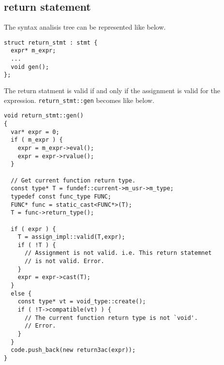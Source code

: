 \subsection{return statement}

The syntax analisis tree can be represented like below.
\begin{verbatim}
struct return_stmt : stmt {
  expr* m_expr;
  ...
  void gen();
};
\end{verbatim}
The return statment is valid if and only if the assignment is valid for the
expression.
{\tt{return\_stmt::gen}} becomes like below.
\begin{verbatim}
void return_stmt::gen()
{
  var* expr = 0;
  if ( m_expr ) {
    expr = m_expr->eval();
    expr = expr->rvalue();
  }

  // Get current function return type.
  const type* T = fundef::current->m_usr->m_type;
  typedef const func_type FUNC;
  FUNC* func = static_cast<FUNC*>(T);
  T = func->return_type();

  if ( expr ) {
    T = assign_impl::valid(T,expr);
    if ( !T ) {
      // Assignment is not valid. i.e. This return statemnet
      // is not valid. Error.
    }
    expr = expr->cast(T);
  }
  else {
    const type* vt = void_type::create();
    if ( !T->compatible(vt) ) {
      // The current function return type is not `void'.
      // Error.
    }
  }
  code.push_back(new return3ac(expr));
}
\end{verbatim}
